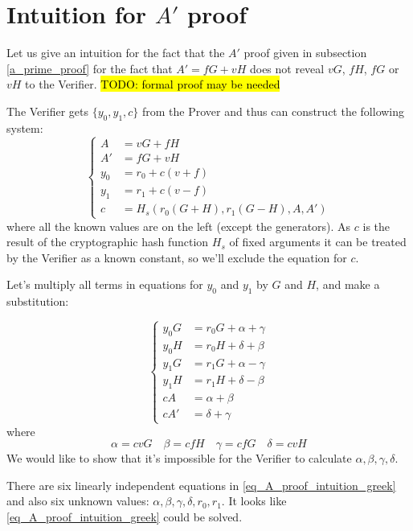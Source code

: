 \documentclass{article}
\numberwithin{figure}{section}
\begin{document}
\newpage
\section{Intuition for $A'$ proof} \label{s_A'_proof_intuition}

Let us give an intuition for the fact that the $A'$ proof given in subsection \ref{a_prime_proof} for the fact that $A' = fG + vH$  does not reveal $vG$, $fH$, $fG$ or $vH$ to the Verifier. \hl{TODO: formal proof may be needed}

The Verifier gets $\{y_0, y_1, c\}$ from the Prover and thus can construct the following system: 
\begin{equation*} %
    \left\{ \begin{aligned} 
        A &= vG + fH \\
        A' &= fG + vH \\
        y_0 &= r_0 + c (v + f) \\
        y_1 &= r_1 + c (v - f) \\
        c &= H_s(r_0(G+H), r_1(G-H), A, A')
    \end{aligned} \right.
\end{equation*}
where all the known values are on the left (except the generators). As $c$ is the result of the cryptographic hash function $H_s$ of fixed arguments it can be treated by the Verifier as a known constant, so we'll exclude the equation for $c$.

Let's multiply all terms in equations for $y_0$ and $y_1$ by $G$ and $H$, and make a substitution:

\begin{equation} \label{eq_A_proof_intuition_greek}
    \left\{ \begin{aligned} 
        y_0 G &= r_0 G + \alpha + \gamma \\
        y_0 H &= r_0 H + \delta + \beta \\
        y_1 G &= r_1 G + \alpha - \gamma \\
        y_1 H &= r_1 H + \delta - \beta \\
        cA &= \alpha + \beta \\
        cA' &= \delta + \gamma
    \end{aligned} \right.
\end{equation}
where
\[
\alpha = cvG \quad \beta = cfH \quad \gamma = cfG \quad \delta = cvH
\]
We would like to show that it's impossible for the Verifier to calculate $\alpha, \beta, \gamma, \delta$.

There are six linearly independent equations in \eqref{eq_A_proof_intuition_greek} and also six unknown values: $\alpha, \beta, \gamma, \delta, r_0, r_1$. It looks like \eqref{eq_A_proof_intuition_greek} could be solved.
\end{document}
